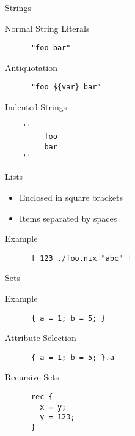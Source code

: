 \documentclass{beamer}
\begin{document}
\begin{frame}[fragile]{Strings}
  \begin{block}{Normal String Literals}
    \begin{lstlisting}
      "foo bar"
    \end{lstlisting}
  \end{block}
  \begin{block}{Antiquotation}
    \begin{lstlisting}
      "foo ${var} bar"
    \end{lstlisting}
  \end{block}
  \begin{block}{Indented Strings}
    \begin{lstlisting}
    ''
         foo
         bar
    ''
    \end{lstlisting}
  \end{block}
\end{frame}

\begin{frame}[fragile]{Lists}
  \begin{itemize}
  \item Enclosed in square brackets
  \item Items separated by spaces
  \end{itemize}
  \begin{block}{Example}
    \begin{lstlisting}
      [ 123 ./foo.nix "abc" ]
    \end{lstlisting}
  \end{block}
\end{frame}

\begin{frame}[fragile]{Sets}
  \begin{block}{Example}
    \begin{lstlisting}
      { a = 1; b = 5; }
    \end{lstlisting}
  \end{block}
  \begin{block}{Attribute Selection}
    \begin{lstlisting}
      { a = 1; b = 5; }.a
    \end{lstlisting}
  \end{block}
  \begin{block}{Recursive Sets}
    \begin{lstlisting}
      rec {
        x = y;
        y = 123;
      }
    \end{lstlisting}
  \end{block}
\end{frame}
\end{document}
